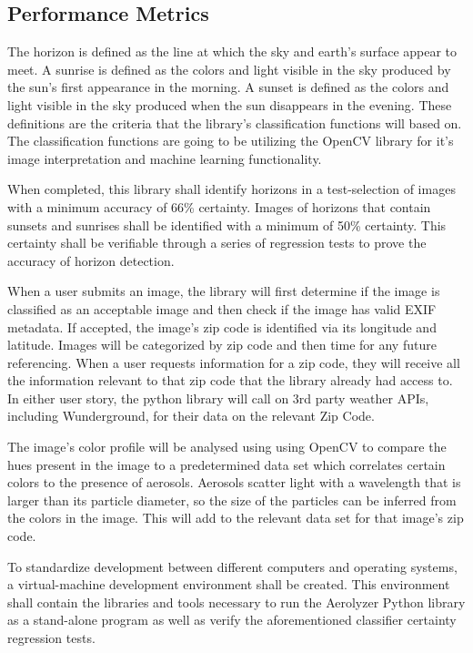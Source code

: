 \documentclass[letterpaper,10pt,draftclsnofoot,onecolumn]{IEEEtran}
\begin{document}
\begin{flushleft}
\section{Performance Metrics} 
The horizon is defined as the line at which the sky and earth's surface appear to meet. A sunrise is defined as the colors and light visible in the sky produced by the sun's first appearance in the morning. A sunset is defined as the colors and light visible in the sky produced when the sun disappears in the evening. These definitions are the criteria that the library’s classification functions will based on. The classification functions are going to be utilizing the OpenCV library for it’s image interpretation and machine learning functionality.
\par
When completed, this library shall identify horizons in a test-selection of images with a minimum accuracy of 66\% certainty. Images of horizons that contain sunsets and sunrises shall be identified with a minimum of 50\% certainty. This certainty shall be verifiable through a series of regression tests to prove the accuracy of horizon detection. 
\par
When a user submits an image, the library will first determine if the image is classified as an acceptable image and then check if the image has valid EXIF metadata. If accepted, the image's zip code is identified via its longitude and latitude. Images will be categorized by zip code and then time for any future referencing. When a user requests information for a zip code, they will receive all the information relevant to that zip code that the library already had access to. In either user story, the python library will call on 3rd party weather APIs, including Wunderground, for their data on the relevant Zip Code.
\par
The image's color profile will be analysed using using OpenCV to compare the hues present in the image to a predetermined data set which correlates certain colors to the presence of aerosols. Aerosols scatter light with a wavelength that is larger than its particle diameter, so the size of the particles can be inferred from the colors in the image. This will add to the relevant data set for that image's zip code. 
\par
To standardize development between different computers and operating systems, a virtual-machine development environment shall be created. This environment shall contain the libraries and tools necessary to run the Aerolyzer Python library as a stand-alone program as well as  verify the aforementioned classifier certainty regression tests.



\end{flushleft}
\end{document}
